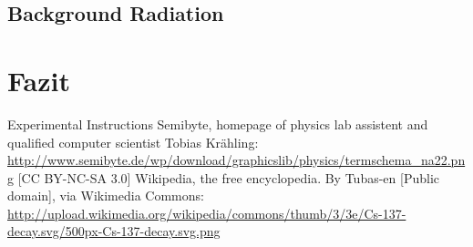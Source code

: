 \documentclass[bigchapter,colorback,accentcolor=tud4b,linedtoc,11pt]{tudreport}
\begin{document}
\section{Background Radiation}


\chapter{Fazit}

\cleardoublepage{}
\newpage
\begin{thebibliography}{100}
   {Experimental Instructions}  {Semibyte, homepage of physics lab assistent and qualified
      computer scientist Tobias Krähling:
      \url{http://www.semibyte.de/wp/download/graphicslib/physics/termschema_na22.png}
    [CC BY-NC-SA 3.0]}
   {Wikipedia, the free encyclopedia. By Tubas-en [Public
      domain], via Wikimedia Commons: \url{http://upload.wikimedia.org/wikipedia/commons/thumb/3/3e/Cs-137-decay.svg/500px-Cs-137-decay.svg.png}}
\end{thebibliography}
\end{document}

